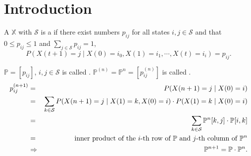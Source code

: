 \section{Introduction}

\begin{definition}
A  $ \mathbb{X} $ with  $ \mathcal{S} $ is a  if there exist numbers $ p_{ij} $ for all states $ i, j \in \mathcal{S} $ and that $ 0 \le p_{ij} \le 1 $ and $ \sum_{j \in \mathcal{S}} p_{ij} = 1 $,
\[ P(X(t + 1) = j \mid X(0) = i_{0}, X(1) = i_{1}, \cdots, X(t) = i_{i}) = p_{ij}. \]

\begin{comment}
The above conditional probability is independent $ i_{0}, \cdots, i_{t - 1} $, and $ t $. Therefore,
\[ P(X(t + 1) = j \mid X(t) = i_{i}) = P(X(t + l + 1) = j \mid X(t + l) = i_{i}). \]
\end{comment}
\end{definition}

\begin{definition}
$ \mathbb{P} = [ p_{ij} ] $, $ i, j \in \mathcal{S} $ is called .
$ \mathbb{P}^{(n)} = \mathbb{P}^{n} = [ p^{(n)}_{ij} ] $ is called .
\begin{eqnarray*}
p^{(n + 1)}_{ij}
  & = & P(X(n + 1) = j \mid X(0) = i) \\
  & = & \sum_{k \in \mathcal{S}} P(X(n + 1) = j \mid X(1) = k, X(0) = i) \cdot P(X(1) = k \mid X(0) = i) \\
  & = & \sum_{k \in \mathcal{S}} \mathbb{P}^{n}[k, j] \cdot \mathbb{P}[i, k] \\
  & = & \text{inner product of the $ i $-th row of $ \mathbb{P} $ and $ j $-th column of $ \mathbb{P}^{n} $} \\
  & \Rightarrow & \mathbb{P}^{n + 1} = \mathbb{P} \cdot \mathbb{P}^{n}.
\end{eqnarray*}
\end{definition}

